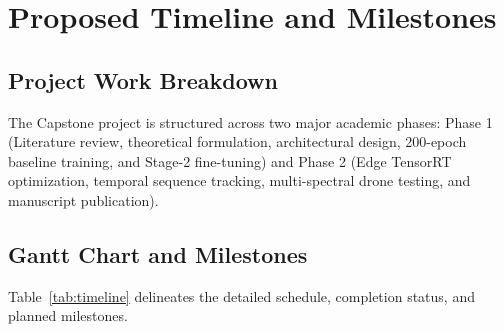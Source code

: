 \documentclass[12pt,a4paper]{report}
\begin{document}
\chapter{Proposed Timeline and Milestones}

\section{Project Work Breakdown}
The Capstone project is structured across two major academic phases: Phase 1 (Literature review, theoretical formulation, architectural design, 200-epoch baseline training, and Stage-2 fine-tuning) and Phase 2 (Edge TensorRT optimization, temporal sequence tracking, multi-spectral drone testing, and manuscript publication).

\section{Gantt Chart and Milestones}
Table~\ref{tab:timeline} delineates the detailed schedule, completion status, and planned milestones.
\end{document}
